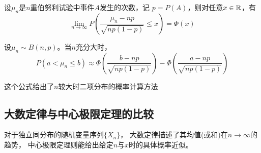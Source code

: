 \begin{theorem}
  设$\mu_n$是$n$重伯努利试验中事件$A$发生的次数，记
  $p=P(A)$，则对任意$x\in\mathbb{R}$，有
  \begin{displaymath}
    \lim_{n\to\infty}P\left(\frac{\mu_n-np}{\sqrt{np(1-p)}}
      \le x\right) = \Phi(x)
  \end{displaymath}
\end{theorem}

\begin{corollary}
  设$\mu_n\sim B(n,p)$。当$n$充分大时，
  \begin{displaymath}
    P(a < \mu_n \le b) \approx
      \Phi\left(\frac{b-np}{\sqrt{np(1-p)}}\right)
      - \Phi\left(\frac{a-np}{\sqrt{np(1-p)}}\right)
  \end{displaymath}
\end{corollary}

\begin{remark}
  这个公式给出了$n$较大时二项分布的概率计算方法
\end{remark}

\subsection{大数定律与中心极限定理的比较}
对于独立同分布的随机变量序列$\{X_n\}$，
大数定律描述了其均值(或和)在$n\to\infty$的趋势，
中心极限定理则能给出给定$n$与$x$时的具体概率近似。
